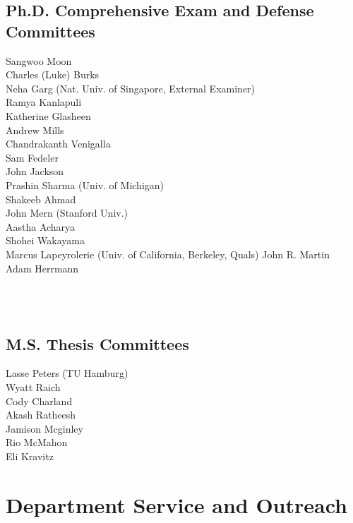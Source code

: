 \documentclass[10pt,roman]{moderncv}
\begin{document}
\begin{minipage}{\textwidth}
\subsection{Ph.D. Comprehensive Exam and Defense Committees}
\begin{multicols}{2}
    \small
    Sangwoo Moon\\
    Charles (Luke) Burks\\
    Neha Garg (Nat. Univ. of Singapore, External Examiner)\\
    Ramya Kanlapuli\\
    Katherine Glasheen\\
    Andrew Mills\\
    Chandrakanth Venigalla\\
    Sam Fedeler\\
    John Jackson\\
    Prashin Sharma (Univ. of Michigan)\\
    Shakeeb Ahmad\\
    John Mern (Stanford Univ.)\\
    Aastha Acharya\\
    Shohei Wakayama\\
    Marcus Lapeyrolerie (Univ. of California, Berkeley, Quals)
    John R. Martin\\
    Adam Herrmann
\end{multicols}
\end{minipage}\\
\\

\subsection{M.S. Thesis Committees}
\begin{multicols}{2}
    \small
    Lasse Peters (TU Hamburg)\\
    Wyatt Raich\\
    Cody Charland\\
    Akash Ratheesh\\
    Jamison Mcginley\\
    Rio McMahon\\
    Eli Kravitz
\end{multicols}

\section{Department Service and Outreach}
\end{document}
